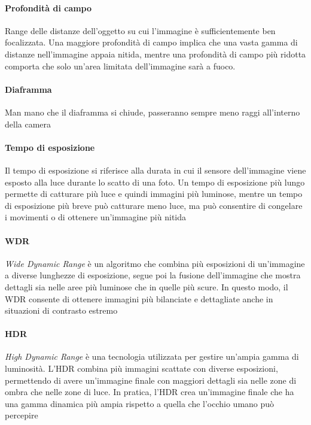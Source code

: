\paragraph{Profondità di campo}
Range delle distanze dell’oggetto su cui l’immagine è sufficientemente ben focalizzata. Una maggiore profondità di campo implica che una vasta gamma di distanze nell'immagine appaia nitida, mentre una profondità di campo più ridotta comporta che solo un'area limitata dell'immagine sarà a fuoco.

\paragraph{Diaframma}
Man mano che il diaframma si chiude, passeranno sempre meno raggi all’interno della camera

\paragraph{Tempo di esposizione}
Il tempo di esposizione si riferisce alla durata in cui il sensore dell'immagine viene esposto alla luce durante lo scatto di una foto. Un tempo di esposizione più lungo permette di catturare più luce e quindi immagini più luminose, mentre un tempo di esposizione più breve può catturare meno luce, ma può consentire di congelare i movimenti o di ottenere un'immagine più nitida

\paragraph{WDR}
\textit{Wide Dynamic Range} è un algoritmo che combina più esposizioni di un'immagine a diverse lunghezze di esposizione, segue poi la fusione dell’immagine che mostra dettagli sia nelle aree più luminose che in quelle più scure. In questo modo, il WDR consente di ottenere immagini più bilanciate e dettagliate anche in situazioni di contrasto estremo

\paragraph{HDR}
\textit{High Dynamic Range} è una tecnologia utilizzata per gestire un'ampia gamma di luminosità. L'HDR combina più immagini scattate con diverse esposizioni, permettendo di avere un'immagine finale con maggiori dettagli sia nelle zone di ombra che nelle zone di luce. In pratica, l'HDR crea un'immagine finale che ha una gamma dinamica più ampia rispetto a quella che l'occhio umano può percepire


